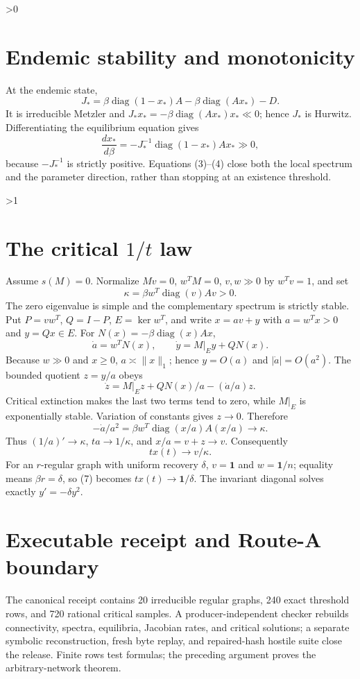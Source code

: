 \documentclass[10pt]{article}
\providecommand{\CRevisionRound}{2}
\begin{document}
\ifnum\CRevisionRound>0
\section{Endemic stability and monotonicity}
At the endemic state,
\begin{equation}
 J_*=\beta\operatorname{diag}(1-x_*)A
 -\beta\operatorname{diag}(Ax_*)-D.                      \tag{3}
\end{equation}
It is irreducible Metzler and
$J_*x_*=-\beta\operatorname{diag}(Ax_*)x_*\ll0$; hence $J_*$ is Hurwitz.
Differentiating the equilibrium equation gives
\[
 \frac{dx_*}{d\beta}=-J_*^{-1}\operatorname{diag}(1-x_*)Ax_*\gg0, \tag{4}
\]
because $-J_*^{-1}$ is strictly positive.  Equations (3)--(4) close both the
local spectrum and the parameter direction, rather than stopping at an
existence threshold.
\fi

\ifnum\CRevisionRound>1
\section{The critical \texorpdfstring{$1/t$}{1/t} law}
Assume $s(M)=0$.  Normalize $Mv=0$, $w^TM=0$, $v,w\gg0$ by $w^Tv=1$, and set
\begin{equation}
 \kappa=\beta w^T\operatorname{diag}(v)Av>0.              \tag{5}
\end{equation}
The zero eigenvalue is simple and the complementary spectrum is strictly
stable.  Put $P=vw^T$, $Q=I-P$, $E=\ker w^T$, and write $x=av+y$ with
$a=w^Tx>0$ and $y=Qx\in E$.  For
$N(x)=-\beta\operatorname{diag}(x)Ax$,
\[
 \dot a=w^TN(x),\qquad \dot y=M|_E y+QN(x).               \tag{6}
\]
Because $w\gg0$ and $x\ge0$, $a\asymp\lVert x\rVert_1$; hence
$y=O(a)$ and $|\dot a|=O(a^2)$.  The bounded quotient $z=y/a$ obeys
\[
 \dot z=M|_E z+QN(x)/a-(\dot a/a)z.
\]
Critical extinction makes the last two terms tend to zero, while $M|_E$ is
exponentially stable.  Variation of constants gives $z\to0$.  Therefore
\[
 -\dot a/a^2=\beta w^T\operatorname{diag}(x/a)A(x/a)\to\kappa.
\]
Thus $(1/a)'\to\kappa$, $ta\to1/\kappa$, and $x/a=v+z\to v$.  Consequently
\begin{equation}
             t x(t)\longrightarrow v/\kappa.              \tag{7}
\end{equation}
For an $r$-regular graph with uniform recovery $\delta$, $v=\mathbf1$ and
$w=\mathbf1/n$; equality means $\beta r=\delta$, so (7) becomes
$t x(t)\to\mathbf1/\delta$.  The invariant diagonal solves exactly
$y'=-\delta y^2$.

\section{Executable receipt and Route-A boundary}
The canonical receipt contains 20 irreducible regular graphs, 240 exact
threshold rows, and 720 rational critical samples.  A producer-independent
checker rebuilds connectivity, spectra, equilibria, Jacobian rates, and
critical solutions; a separate symbolic reconstruction, fresh byte replay,
and repaired-hash hostile suite close the release.  Finite rows test formulas;
the preceding argument proves the arbitrary-network theorem.
\end{document}

